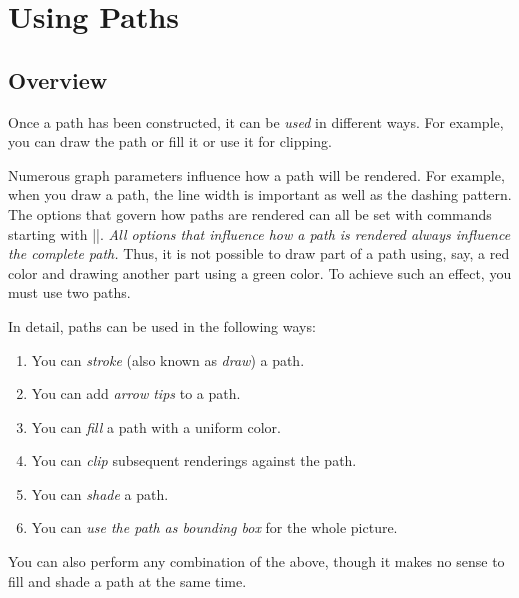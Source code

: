 %
%
%


\section[base-actions]{Using Paths}

\subsection{Overview}

Once a path has been constructed, it can be \emph{used} in different ways. For
example, you can draw the path or fill it or use it for clipping.

Numerous graph parameters influence how a path will be rendered. For example,
when you draw a path, the line width is important as well as the dashing
pattern. The options that govern how paths are rendered can all be set with
commands starting with |\pgfset|. \emph{All options that influence how a path
is rendered always influence the complete path.} Thus, it is not possible to
draw part of a path using, say, a red color and drawing another part using a
green color. To achieve such an effect, you must use two paths.

In detail, paths can be used in the following ways:
%
\begin{enumerate}
    \item You can \emph{stroke} (also known as \emph{draw}) a path.
    \item You can add \emph{arrow tips} to a path.
    \item You can \emph{fill} a path with a uniform color.
    \item You can \emph{clip} subsequent renderings against the path.
    \item You can \emph{shade} a path.
    \item You can \emph{use the path as bounding box} for the whole picture.
\end{enumerate}
%
You can also perform any combination of the above, though it makes no sense to
fill and shade a path at the same time.

